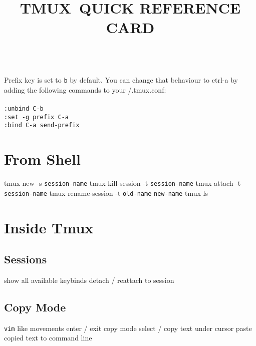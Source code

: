 
\def\content{TMUX}
\def\versionnumber{0.2}  %
\def\year{2014}
\def\month{May}
\def\version{v\versionnumber\ \month\ \year}



\title{\content\ QUICK REFERENCE CARD}

\shortintro\\

Prefix key is set to {\tt \ctrl b} by default. You can
change that behaviour to ctrl-a by adding the following
commands to your \tild/.tmux.conf:\\\\
{\tt :unbind C-b\\
    :set -g prefix C-a\\
    :bind C-a send-prefix\\}
\section{From Shell}{}

	{tmux new -s {\tt session-name}}
	{tmux kill-session -t {\tt session-name}}
	{tmux attach -t {\tt session-name}}
	{tmux rename-session -t {\tt old-name} {\tt new-name}}
	{tmux ls}

\section{Inside Tmux}{}

\subsection{Sessions}{}
	{show all available keybinds}
	{detach / reattach to session}

\subsection{Copy Mode}{{\tt vim} like movements}
	{enter / exit copy mode}
	{select / copy text under cursor}
	{paste copied text to command line}

